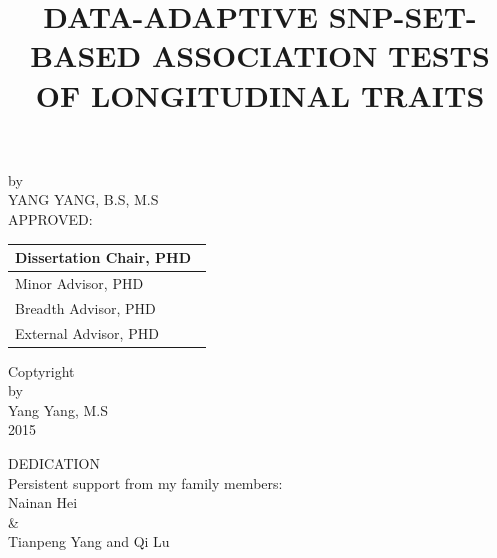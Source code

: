 \documentclass[12pt]{article}
\begin{document}
%
\begin{titlepage}
\title{\normalsize DATA-ADAPTIVE SNP-SET-BASED ASSOCIATION TESTS OF LONGITUDINAL TRAITS}
\date{}
\maketitle

{\normalsize
\begin{center}
by\\[5mm]
YANG YANG, B.S, M.S\\[10mm]
APPROVED:\\[10mm]
\end{center}}

\begin{table}[h]
\begin{flushright}
\begin{tabular}{ p{8cm}}

\hline
Dissertation Chair, PHD\ \\[0.8cm]
\hline
Minor Advisor, PHD\\[0.8cm]
\hline
Breadth Advisor, PHD\\[0.8cm]
\hline
External Advisor, PHD\\[0.8cm]


\end{tabular}
\end{flushright}
\label{default}
\end{table}

\thispagestyle{empty}
\pagestyle{empty}
\end{titlepage}

\newpage
\thispagestyle{empty}
\begin{center}
Coptyright\\
by\\
Yang Yang, M.S\\
2015
\end{center}


\newpage
\thispagestyle{empty}
\doublespacing
\begin{center}
DEDICATION\\
Persistent support from my family members:\\
Nainan Hei\\
\&\\
Tianpeng Yang and Qi Lu
\end{center}
\end{document}
